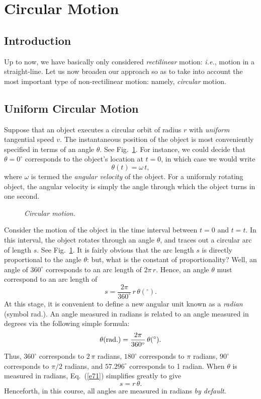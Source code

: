 \section{Circular Motion}
\subsection{Introduction}
Up to now, we have basically only considered {\em rectilinear} motion: {\em i.e.}, motion
in a straight-line. Let us now broaden our approach so as to take into account
the most important type of non-rectilinear motion: namely, {\em circular} motion.

\subsection{Uniform Circular Motion}
Suppose that an object executes a circular orbit of radius
$r$ with {\em uniform} tangential speed $v$. The instantaneous
position of the object is most conveniently specified in terms of an
angle $\theta$.  See Fig.~\ref{f58}. For instance, we could decide that $\theta=0^\circ$ corresponds
to the object's location at $t=0$, in  which case we would write
\begin{equation}
\theta(t) = \omega\,t,
\end{equation}
where $\omega$ is termed the {\em angular velocity} of the object. For a uniformly
rotating object, the angular velocity is simply the angle through which the object
turns in one second.

\begin{figure}[h]
\epsfysize=1.7in
\centerline{}
\caption{\em Circular motion.}\label{f58}  
\end{figure}

Consider the motion of the object in the time interval between
$t=0$ and $t=t$. In this interval, the object rotates through an angle
$\theta$, and traces out a circular arc of length $s$. See Fig.~\ref{f58}. 
It is fairly obvious that the arc length $s$ is directly proportional to the angle
$\theta$: but, what is the constant of proportionality? Well, an angle of
$360^\circ$ corresponds to an arc length of $2\pi\,r$. Hence, an angle $\theta$
must correspond to an arc length of
\begin{equation}\label{e71}
s = \frac{2\pi}{360^\circ} \,r\,\theta(^\circ).
\end{equation}
At this stage, it is convenient to define a new angular unit known as a {\em radian} (symbol rad.). An angle
measured in radians is related to an angle measured in degrees via the
following simple formula:
\begin{equation}
\theta({\rm rad.}) = \frac{2\pi}{360^\circ}\,\theta(^\circ).
\end{equation}
Thus, $360^\circ$ corresponds to $2\,\pi$ radians, $180^\circ$ corresponds to $\pi$ radians,
$90^\circ$ corresponds to $\pi/2$ radians, and $57.296^\circ$ corresponds
to 1 radian. When $\theta$ is measured in radians, Eq.~(\ref{e71}) simplifies
greatly to give
\begin{equation}
s = r\,\theta.
\end{equation}
Henceforth, in this course, all angles are measured in radians {\em by default}.

